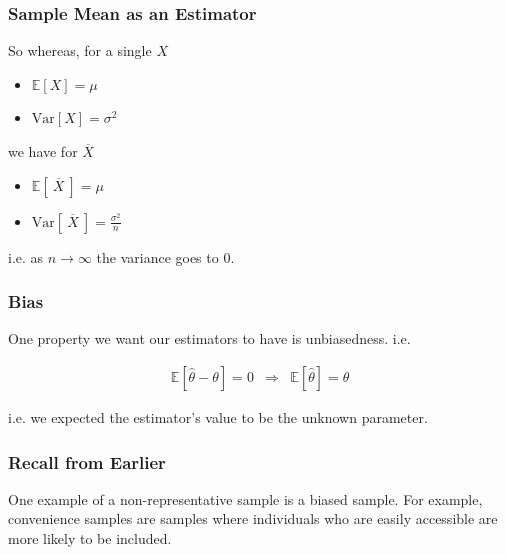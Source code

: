 \documentclass[handout]{beamer}
\newcommand{\blue}[1]{\textcolor{blue2}{#1}}
\newcommand{\E}{\mathbb{E}}
\newcommand{\Var}{\mbox{Var}}
\begin{document}
\begin{frame}
\frametitle{Sample Mean as an Estimator}

%
%
So whereas, for a single $X$
\begin{itemize}
\item $\E[X] = \mu$
\item $\Var[X] = \sigma^2$
\end{itemize}

\vspace{0.25cm}

\pause we have for $\overline{X}$

\vspace{0.25cm}

\begin{itemize}
\item $\E\left[ \ \overline{X} \ \right] = \mu$
\item $\Var\left[ \ \overline{X} \ \right] = \frac{\sigma^2}{n}$
\end{itemize}
i.e. as $n \longrightarrow \infty$ the variance goes to 0.  

\end{frame}


\begin{frame}
\frametitle{Bias}

%
%
One property we want our estimators to have is \blue{unbiasedness}.  i.e.

\begin{eqnarray*}
\E[\widehat{\theta} - \theta] = 0 &\Rightarrow & \E[\widehat{\theta}] = \theta
\end{eqnarray*}

\pause i.e. we expected the estimator's value to be the unknown parameter.  

\end{frame}


\begin{frame}
\frametitle{Recall from Earlier}

One example of a non-representative sample is a \blue{biased sample}. For example, \blue{convenience samples} are samples where individuals who are easily accessible are more likely to be included.  

\end{frame}
\end{document}
